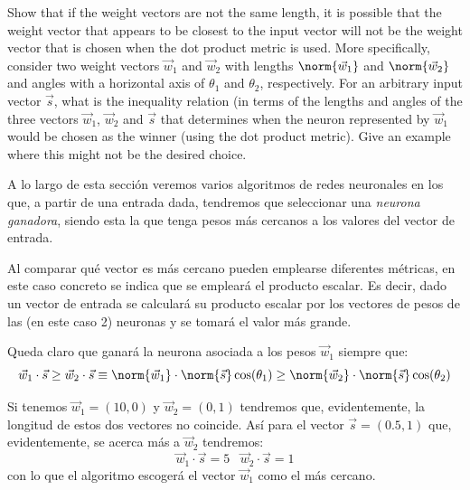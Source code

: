 \begin{problem}[1]
Show that if the weight vectors are not the same length, it is possible that the weight vector that appears to be closest to the input vector will not be the weight vector that is chosen when the dot product metric is used. More specifically, consider two weight vectors $\vec{w}_1$ and $\vec{w}_2$ with lengths $\norm{\vec{w}_1}$ and $\norm{\vec{w}_2}$ and angles with a horizontal axis of $\theta_1$ and $\theta_2$, respectively. For an arbitrary input vector $\vec{s}$, what is the inequality relation (in terms of the lengths and angles of the three vectors $\vec{w}_1$, $\vec{w}_2$ and $\vec{s}$ that determines when the neuron represented by $\vec{w}_1$ would be chosen as the winner (using the dot product metric). Give an example where this might not be the desired choice.

\solution
{}

A lo largo de esta sección veremos varios algoritmos de redes neuronales en los que, a partir de una entrada dada, tendremos que seleccionar una \emph{neurona ganadora}, siendo esta la que tenga pesos más cercanos a los valores del vector de entrada.

Al comparar qué vector es más cercano pueden emplearse diferentes métricas, en este caso concreto se indica que se empleará el producto escalar. Es decir, dado un vector de entrada se calculará su producto escalar por los vectores de pesos de las (en este caso 2) neuronas y se tomará el valor más grande.

Queda claro que ganará la neurona asociada a los pesos $\vec{w}_1$ siempre que:
\[\vec{w}_1\cdot \vec{s} \geq \vec{w}_2\cdot \vec{s} \equiv \norm{\vec{w}_1}\cdot \norm{\vec{s}}\cos(\theta_1) \geq \norm{\vec{w}_2}\cdot \norm{\vec{s}}\cos(\theta_2)\]

Si tenemos $\vec{w}_1=(10,0)$ y $\vec{w}_2=(0,1)$ tendremos que, evidentemente, la longitud de estos dos vectores no coincide. Así para el vector $\vec{s}=(0.5,1)$ que, evidentemente, se acerca más a $\vec{w}_2$ tendremos:
\[\vec{w}_1\cdot \vec{s} = 5 \;\;\; \vec{w}_2\cdot \vec{s} = 1\]
con lo que el algoritmo escogerá el vector $\vec{w}_1$ como el más cercano.
\end{problem}

